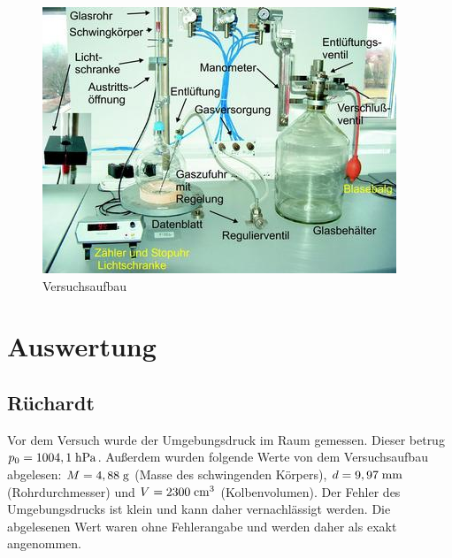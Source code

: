 \documentclass[12pt, a4paper, twoside]{scrartcl}
\begin{document}
\begin{figure}[!h]
 \centering
 \includegraphics[scale=1.0]{aufbau.png}
 \caption{\label{fig:aufbau}Versuchsaufbau\protect\footnotemark}
\end{figure}

\section{Auswertung}
\label{sec:auswertung}

\subsection{Rüchardt}
Vor dem Versuch wurde der Umgebungsdruck im Raum gemessen. Dieser betrug $p_0=1004,1\hecto\pascal$. Außerdem wurden folgende Werte von dem Versuchsaufbau abgelesen: $M=4,88\gramm$ (Masse des schwingenden Körpers), $d=9,97\milli\meter$ (Rohrdurchmesser) und $V=2300\centi\meter^3$ (Kolbenvolumen). Der Fehler des Umgebungsdrucks ist klein und kann daher vernachlässigt werden. Die abgelesenen Wert waren ohne Fehlerangabe und werden daher als exakt angenommen.\\
\end{document}
